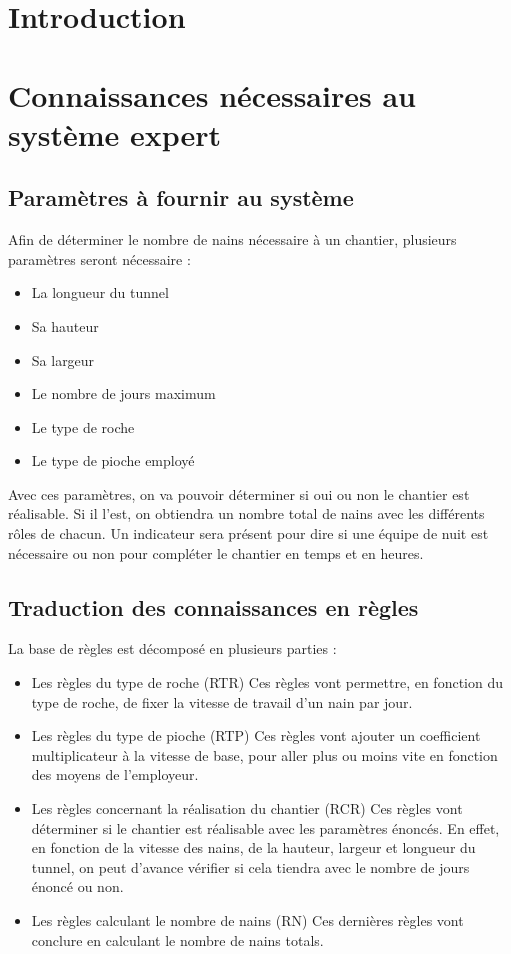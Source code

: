 \documentclass[a4paper,10pt]{report}
\begin{document}
\chapter*{Introduction}
\chapter{Connaissances nécessaires au système expert}
 \section{Paramètres à fournir au système}
 Afin de déterminer le nombre de nains nécessaire à un chantier, plusieurs paramètres seront nécessaire :
\begin{itemize}
\item La longueur du tunnel
\item Sa hauteur
\item Sa largeur
\item Le nombre de jours maximum
\item Le type de roche
\item Le type de pioche employé
\end{itemize}

Avec ces paramètres, on va pouvoir déterminer si oui ou non le chantier est réalisable. Si il l’est, on obtiendra un nombre total de nains avec les différents rôles de chacun. Un indicateur sera présent pour dire si une équipe de nuit est nécessaire ou non pour compléter le chantier en temps et en heures.

\section{Traduction des connaissances en règles}

La base de règles est décomposé en plusieurs parties :
\begin{itemize}
\item Les règles du type de roche (RTR)
Ces règles vont permettre, en fonction du type de roche, de fixer la vitesse de travail d’un nain par jour.

\item Les règles du type de pioche (RTP)
Ces règles vont ajouter un coefficient multiplicateur à la vitesse de base, pour aller plus ou moins vite en fonction des moyens de l’employeur.

\item Les règles concernant la réalisation du chantier (RCR)
Ces règles vont déterminer si le chantier est réalisable avec les paramètres énoncés. En effet, en fonction de la vitesse des nains, de la hauteur, largeur et longueur du tunnel, on peut d’avance vérifier si cela tiendra avec le nombre de jours énoncé ou non.

\item Les règles calculant le nombre de nains (RN)
Ces dernières règles vont conclure en calculant le nombre de nains totals.
\end{itemize}
\end{document}
